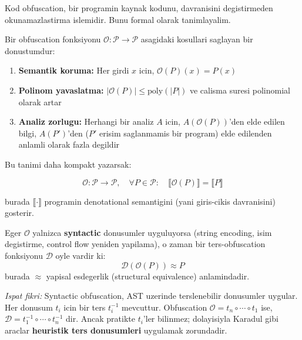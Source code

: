 Kod obfuscation, bir programin kaynak kodunu, davranisini degistirmeden okunamazlastirma islemidir. Bunu formal olarak tanimlayalim.

\begin{tanim}
Bir obfuscation fonksiyonu $\mathcal{O}: \mathcal{P} \to \mathcal{P}$ asagidaki kosullari saglayan bir donustumdur:
\begin{enumerate}
\item \textbf{Semantik koruma:} Her girdi $x$ icin, $\mathcal{O}(P)(x) = P(x)$
\item \textbf{Polinom yavaslatma:} $|\mathcal{O}(P)| \leq \text{poly}(|P|)$ ve calisma suresi polinomial olarak artar
\item \textbf{Analiz zorlugu:} Herhangi bir analiz $A$ icin, $A(\mathcal{O}(P))$'den elde edilen bilgi, $A(P')$'den ($P'$ erisim saglanmamis bir program) elde edilenden anlamli olarak fazla degildir
\end{enumerate}
\end{tanim}

Bu tanimi daha kompakt yazarsak:

\begin{equation}
\mathcal{O}: \mathcal{P} \to \mathcal{P}, \quad \forall P \in \mathcal{P}: \quad \llbracket \mathcal{O}(P) \rrbracket = \llbracket P \rrbracket
\label{eq:semantic-preservation}
\end{equation}

burada $\llbracket \cdot \rrbracket$ programin denotational semantigini (yani giris-cikis davranisini) gosterir.

\begin{theorem}
Eger $\mathcal{O}$ yalnizca \textbf{syntactic} donusumler uyguluyorsa (string encoding, isim degistirme, control flow yeniden yapilama), o zaman bir ters-obfuscation fonksiyonu $\mathcal{D}$ oyle vardir ki:
\begin{equation}
\mathcal{D}(\mathcal{O}(P)) \approx P
\label{eq:deobf-inverse}
\end{equation}
burada $\approx$ yapisal esdegerlik (structural equivalence) anlamindadir.
\end{theorem}

\textit{Ispat fikri:} Syntactic obfuscation, AST uzerinde terslenebilir donusumler uygular. Her donusum $t_i$ icin bir ters $t_i^{-1}$ mevcuttur. Obfuscation $\mathcal{O} = t_n \circ \cdots \circ t_1$ ise, $\mathcal{D} = t_1^{-1} \circ \cdots \circ t_n^{-1}$ dir. Ancak pratikte $t_i$'ler bilinmez; dolayisiyla Karadul gibi araclar \textbf{heuristik ters donusumleri} uygulamak zorundadir.

